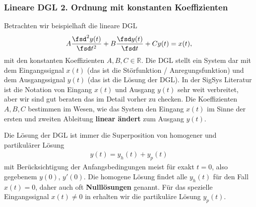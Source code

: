 \subsubsection{Lineare DGL 2. Ordnung mit konstanten Koeffizienten}
Betrachten wir beispielhaft die lineare DGL
\begin{align}
\label{eq:A7BEE9E24E_DGL}
A \frac{\fsd^2 y(t)}{\fsd t^2} + B \frac{\fsd y(t)}{\fsd t} + C y(t) = x(t),
\end{align}
mit den konstanten Koeffizienten $A,B,C\in\mathbb{R}$.
%
Die DGL stellt ein System dar mit dem Eingangssignal $x(t)$
(das ist die Störfunktion / Anregungsfunktion) und dem Ausgangssignal
$y(t)$ (das ist die Lösung der DGL).
%
In der SigSys Literatur ist die Notation von Eingang $x(t)$ und Ausgang $y(t)$
sehr weit verbreitet, aber wir sind gut beraten das im Detail vorher zu checken.
%
Die Koeffizienten $A,B,C$ bestimmen im Wesen, wie das System den Eingang $x(t)$
im Sinne der ersten und zweiten Ableitung \textbf{linear ändert} zum Ausgang $y(t)$.

Die Lösung der DGL ist immer die Superposition von homogener und partikulärer
Lösung
%
\begin{align}
y(t) = y_h(t) + y_p(t)
\end{align}
mit Berücksichtigung der Anfangsbedingungen meist für exakt $t=0$, also gegebenem
$y(0)$, $y'(0)$.
%
Die homogene Lösung findet alle $y_h(t)$ für den Fall $x(t)=0$, daher auch oft
\textbf{Nulllösungen} genannt. Für das spezielle Eingangssignal $x(t)\neq 0$ in
 erhalten wir die partikuläre Lösung $y_p(t)$.
%
